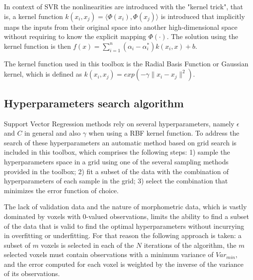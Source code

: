 \documentclass{article}
\begin{document}
\begin{itemize}
In context of SVR the nonlinearities are introduced with the "kernel trick", that is, a kernel function $ k(x_i, x_j) = \langle \Phi(x_i), \Phi(x_j) \rangle $ is introduced that implicitly maps the inputs from their original space into another high-dimensional space without requiring to know the explicit mapping $ \Phi(\cdot) $. The solution using the kernel function is then $ f(x) = \sum_{i=1}^{n} (\alpha_i - \alpha^*_i)k(x_i, x) + b$. 

The kernel function used in this toolbox is the Radial Basis Function or Gaussian kernel, which is defined as $ k(x_i, x_j) = exp(-\gamma \|x_i - x_j\|^2)$.
\end{itemize}

\subsection{Hyperparameters search algorithm}

Support Vector Regression methods rely on several hyperparameters, namely $\epsilon$ and $C$ in general and also $\gamma$ when using a RBF kernel function. To address the search of these hyperparameters an automatic method based on grid search is included in this toolbox, which comprises the following steps: 1) sample the hyperparameters space in a grid using one of the several sampling methods provided in the toolbox; 2) fit a subset of the data with the combination of hyperparameters of each sample in the grid; 3) select the combination that minimizes the error function of choice. 

The lack of validation data and the nature of morphometric data, which is vastly dominated by voxels with 0-valued observations, limits the ability to find a subset of the data that is valid to find the optimal hyperparameters without incurrying in overfitting or underfitting. For that reason the following approach is taken: a subset of $m$ voxels is selected in each of the $N$ iterations of the algorithm, the $m$ selected voxels must contain observations with a minimum variance of $Var_{min}$, and the error computed for each voxel is weighted by the inverse of the variance of its observations. 
\end{document}
